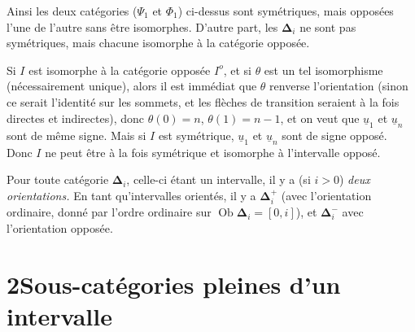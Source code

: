 \documentclass[11pt]{article}
\newcommand{\printedpage}[1]{\if\relax\detokenize{#1}\relax\else\marginpar{\raggedright\footnotesize p.~#1}\fi}
\newcommand{\msp}[1]{\marginpar{\raggedright\footnotesize [#1]}}
\newcommand{\bD}{\boldsymbol{\Delta}}
\begin{document}
Ainsi les deux catégories ($\Psi_1$ et $\Phi_1$) ci-dessus sont symétriques, mais opposées l'une de l'autre sans être isomorphes. D'autre part, les $\bD_i$ ne sont pas symétriques, mais chacune isomorphe à la catégorie opposée.

Si $I$ est isomorphe à la catégorie opposée $I^o$, et si $\theta$ est un tel isomorphisme (nécessairement unique), alors il est immédiat que $\theta$ renverse l'orientation (sinon ce serait l'identité sur les sommets, et les flèches de transition seraient à la fois directes et indirectes), donc $\theta(0) = n$, $\theta(1) = n-1$, et on veut que $\underline{u}_1$ et $\underline{u}_n$ sont de même signe. Mais si $I$ est symétrique, $\underline{u}_1$ et $\underline{u}_n$ sont de signe opposé. Donc $I$ ne peut être à la fois symétrique et isomorphe à l'intervalle opposé.

Pour toute catégorie $\bD_i$, celle-ci étant un intervalle, il y a (si $i > 0$) \textit{deux orientations.} En tant qu'intervalles orientés, il y a $\bD_i^+$ (avec l'orientation ordinaire, donné par l'ordre ordinaire sur $\operatorname{Ob} \bD_i = [0,i]$), et $\bD_i^-$ avec l'orientation opposée.

\printedpage{6}

\msp{page 10}

\section*{2\quad Sous-catégories pleines d'un intervalle}
\end{document}
